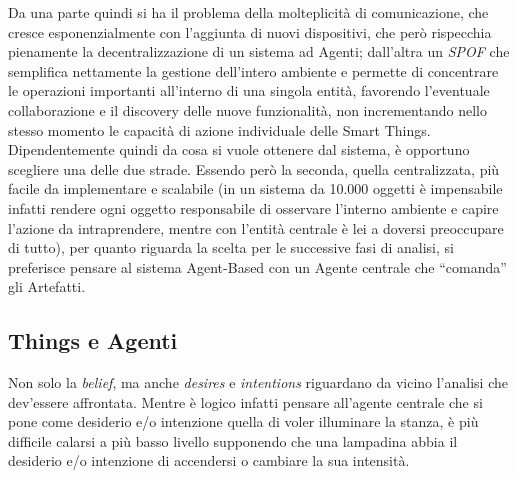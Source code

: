 \documentclass[12pt,a4paper,openright,oneside]{report}
\newcommand{\quotes}[1]{``#1''}
\begin{document}
Da una parte quindi si ha il problema della molteplicità di comunicazione, che cresce esponenzialmente con l'aggiunta di nuovi dispositivi, che però rispecchia pienamente la decentralizzazione di un sistema ad Agenti; dall'altra un \textit{SPOF} che semplifica nettamente la gestione dell'intero ambiente e permette di concentrare le operazioni importanti all'interno di una singola entità, favorendo l'eventuale collaborazione e il discovery delle nuove funzionalità, non incrementando nello stesso momento le capacità di azione individuale delle Smart Things.
Dipendentemente quindi da cosa si vuole ottenere dal sistema, è opportuno scegliere una delle due strade. Essendo però la seconda, quella centralizzata, più facile da implementare e scalabile (in un sistema da 10.000 oggetti è impensabile infatti rendere ogni oggetto responsabile di osservare l'interno ambiente e capire l'azione da intraprendere, mentre con l'entità centrale è lei a doversi preoccupare di tutto), per quanto riguarda la scelta per le successive fasi di analisi, si preferisce pensare al sistema Agent-Based con un Agente centrale che \quotes{comanda} gli Artefatti.

\subsection{Things e Agenti}
Non solo la \textit{belief}, ma anche \textit{desires} e \textit{intentions} riguardano da vicino l'analisi che dev'essere affrontata. Mentre è logico infatti pensare all'agente centrale che si pone come desiderio e/o intenzione quella di voler illuminare la stanza, è più difficile calarsi a più basso livello supponendo che una lampadina abbia il desiderio e/o intenzione di accendersi o cambiare la sua intensità.\\
\end{document}
